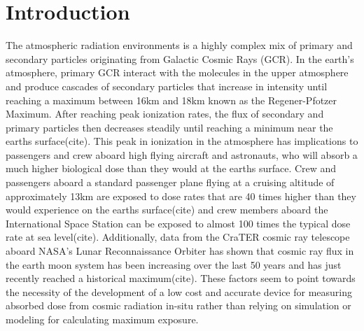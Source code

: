 \section{Introduction}
\label{Introduction}
The atmospheric radiation environments is a highly complex mix of primary and secondary particles originating from Galactic Cosmic Rays (GCR). In the earth’s atmosphere, primary GCR interact with the molecules in the upper atmosphere and produce cascades of secondary particles that increase in intensity until reaching a maximum between 16km and 18km known as the Regener-Pfotzer Maximum. After reaching peak ionization rates, the flux of secondary and primary particles then decreases steadily until reaching a minimum near the earths surface(cite). This peak in ionization in the atmosphere has implications to passengers and crew aboard high flying aircraft and astronauts, who will absorb a much higher biological dose than they would at the earths surface.  Crew and passengers aboard a standard passenger plane flying at a cruising altitude of approximately 13km are exposed to dose rates that are 40 times higher than they would experience on the earths surface(cite) and crew members aboard the International Space Station can be exposed to almost 100 times the typical dose rate at sea level(cite). Additionally, data from the CraTER cosmic ray telescope aboard NASA’s Lunar Reconnaissance Orbiter has shown that cosmic ray flux in the earth moon system has been increasing over the last 50 years and has just recently reached a historical maximum(cite). These factors seem to point towards the necessity of the development of a low cost and accurate device for measuring absorbed dose from cosmic radiation in-situ rather than relying on simulation or modeling for calculating maximum exposure. 

